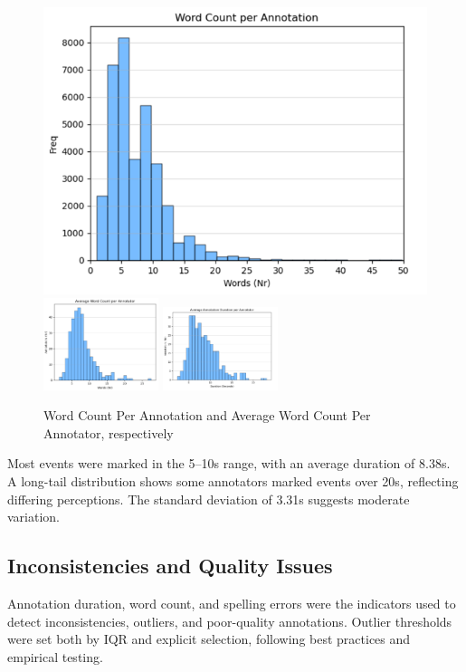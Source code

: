 \documentclass{article}
\begin{document}
\begin{figure}[h!]
    \centering
    \includegraphics[width=0.3\linewidth]{figures/annotation_quality/word_count_per_annotation.png}
    \includegraphics[width=0.3\textwidth]{figures/annotation_quality/average_word_count_per_annotator.png}
    \includegraphics[width=0.3\textwidth]{figures/annotation_quality/average_annotation_duration_per_annotator.png}
    \caption{Word Count Per Annotation and Average Word Count Per Annotator, respectively} \label{fig:word_count_avg_word_count_avg_duration}
\end{figure}

Most events were marked in the 5–10s range, with an average duration of 8.38s. A long-tail distribution shows some annotators marked events over 20s, reflecting differing perceptions. The standard deviation of 3.31s suggests moderate variation.

\subsection{Inconsistencies and Quality Issues}

Annotation duration, word count, and spelling errors were the indicators used to detect inconsistencies, outliers, and poor-quality annotations. Outlier thresholds were set both by IQR and explicit selection, following best practices and empirical testing.
\end{document}
